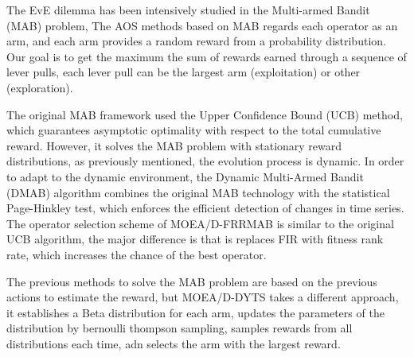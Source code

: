 \documentclass[journal]{IEEEtran}
\begin{document}
The EvE dilemma has been intensively studied in the Multi-armed Bandit (MAB) problem,
The AOS methods based on MAB regards each operator as an arm, and each arm provides a random reward from a probability distribution. Our goal is to get the maximum the sum of rewards earned through a sequence of lever pulls, each lever pull can be the largest arm (exploitation) or other (exploration).

The original MAB framework used the Upper Confidence Bound (UCB) \cite{auer2002finite} method, which guarantees asymptotic optimality with respect to the total cumulative reward. However, it solves the MAB problem with stationary reward distributions, as previously mentioned, the evolution process is dynamic.
In order to adapt to the dynamic environment, the Dynamic Multi-Armed Bandit (DMAB) \cite{dacosta2008adaptive} algorithm combines the original MAB technology with the statistical Page-Hinkley test, which enforces the efficient detection of changes in time series.
The operator selection scheme of MOEA/D-FRRMAB \cite{frrmab} is similar to the original UCB algorithm, the major difference is that is replaces FIR with fitness rank rate, which increases the chance of the best operator.

The previous methods to solve the MAB problem are based on the previous actions to estimate the reward, but MOEA/D-DYTS \cite{aos_dyts} takes a different approach, it establishes a Beta distribution for each arm, updates the parameters of the distribution by bernoulli thompson sampling, samples rewards from all distributions each time, adn selects the arm with the largest reward.
\end{document}
